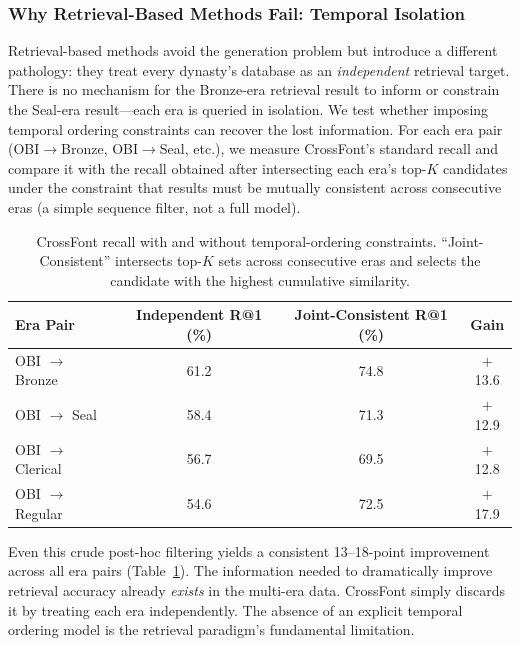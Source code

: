 \documentclass{article}
\begin{document}
\subsubsection{Why Retrieval-Based Methods Fail: Temporal Isolation}
\label{sec:pre:s3}

Retrieval-based methods avoid the generation problem but introduce a different pathology: they treat every dynasty's database as an \emph{independent} retrieval target. There is no mechanism for the Bronze-era retrieval result to inform or constrain the Seal-era result—each era is queried in isolation. We test whether imposing temporal ordering constraints can recover the lost information. For each era pair (OBI$\to$Bronze, OBI$\to$Seal, etc.), we measure CrossFont's standard recall and compare it with the recall obtained after intersecting each era's top-$K$ candidates under the constraint that results must be mutually consistent across consecutive eras (a simple sequence filter, not a full model).

\begin{table}[h]
  \centering
  \caption{CrossFont recall with and without temporal-ordering constraints. ``Joint-Consistent'' intersects top-$K$ sets across consecutive eras and selects the candidate with the highest cumulative similarity.}
  \label{tab:pre:s3}
  \begin{tabular}{lccc}
    \toprule
    \textbf{Era Pair} &
    \textbf{Independent R@1 (\%)} &
    \textbf{Joint-Consistent R@1 (\%)} &
    \textbf{Gain} \\
    \midrule
    OBI $\to$ Bronze  & 61.2 & 74.8 & $+$13.6 \\
    OBI $\to$ Seal    & 58.4 & 71.3 & $+$12.9 \\
    OBI $\to$ Clerical & 56.7 & 69.5 & $+$12.8 \\
    OBI $\to$ Regular  & 54.6 & 72.5 & $+$17.9 \\
    \bottomrule
  \end{tabular}
\end{table}

Even this crude post-hoc filtering yields a consistent 13–18-point improvement across all era pairs (Table~\ref{tab:pre:s3}). The information needed to dramatically improve retrieval accuracy already \emph{exists} in the multi-era data. CrossFont simply discards it by treating each era independently. The absence of an explicit temporal ordering model is the retrieval paradigm's fundamental limitation.
\end{document}
